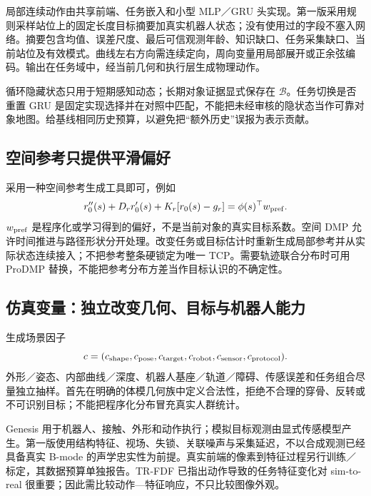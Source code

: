 \documentclass[UTF8,11pt,a4paper,fontset=fandol]{ctexart}
\numberwithin{equation}{section}
\theoremstyle{definition}
\begin{document}
局部连续动作由共享前端、任务嵌入和小型 MLP／GRU 头实现。第一版采用规则采样站位上的固定长度目标摘要加真实机器人状态；没有使用过的字段不塞入网络。摘要包含均值、误差尺度、最后可信观测年龄、知识缺口、任务采集缺口、当前站位及有效模式。曲线左右方向需连续定向，周向变量用局部展开或正余弦编码。输出在任务域中，经当前几何和执行层生成物理动作。

循环隐藏状态只用于短期感知动态；长期对象证据显式保存在 $\mathcal B$。任务切换是否重置 GRU 是固定实现选择并在对照中匹配，不能把未经审核的隐状态当作可靠对象地图。给基线相同历史预算，以避免把“额外历史”误报为表示贡献。

\subsection{空间参考只提供平滑偏好}
采用一种空间参考生成工具即可，例如
\begin{equation}
r_0''(s)+D_r r_0'(s)+K_r[r_0(s)-g_r]=\phi(s)^\top w_{\rm pref}.
\label{eq:dmp82}
\end{equation}
$w_{\rm pref}$ 是程序化或学习得到的偏好，不是当前对象的真实目标系数。空间 DMP 允许时间推进与路径形状分开处理\cite{aldmp}。改变任务或目标估计时重新生成局部参考并从实际状态连续接入；不把参考整条硬锁定为唯一 TCP。需要轨迹联合分布时可用 ProDMP 替换，不能把参考分布方差当作目标认识的不确定性\cite{prodmp}。

\subsection{仿真变量：独立改变几何、目标与机器人能力}
生成场景因子
\begin{equation}
c=(c_{\rm shape},c_{\rm pose},c_{\rm target},c_{\rm robot},
 c_{\rm sensor},c_{\rm protocol}).
\label{eq:factors}
\end{equation}
外形／姿态、内部曲线／深度、机器人基座／轨道／障碍、传感误差和任务组合尽量独立抽样。首先在明确的体模几何族中定义合法性，拒绝不合理的穿骨、反转或不可识别目标；不能把程序化分布冒充真实人群统计。

Genesis 用于机器人、接触、外形和动作执行；模拟目标观测由显式传感模型产生。第一版使用结构特征、视场、失锁、关联噪声与采集延迟，不以合成观测已经具备真实 B-mode 的声学忠实性为前提。真实前端的像素到特征过程另行训练／标定，其数据预算单独报告。TR-FDF 已指出动作导致的任务特征变化对 sim-to-real 很重要\cite{trfdf}；因此需比较动作—特征响应，不只比较图像外观。
\end{document}
